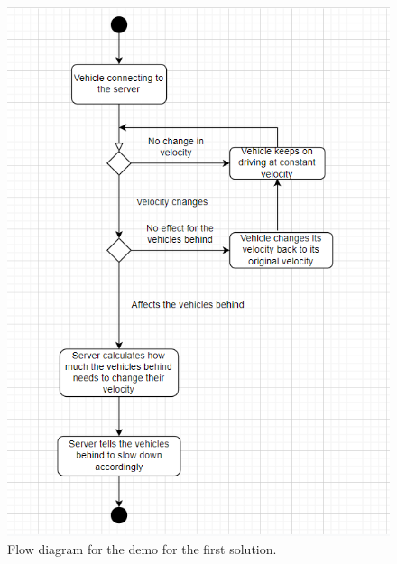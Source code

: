 \begin{figure}[h!]
	\centering
	\includegraphics[width=1\linewidth]{figures/flow_diagram_first}
	\caption[Flow diagram server]{Flow diagram for the demo for the first solution.}
	\label{fig:diagramfirst}
\end{figure}